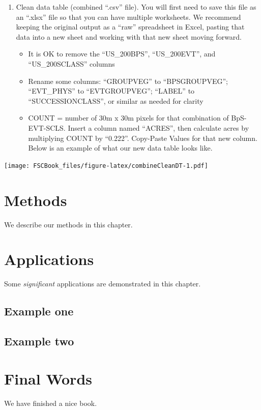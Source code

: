 \documentclass[
]{book}
\providecommand{\tightlist}{%
  \setlength{\itemsep}{0pt}\setlength{\parskip}{0pt}}
\begin{document}
\begin{enumerate}
\def\labelenumi{\arabic{enumi}.}
\setcounter{enumi}{2}
\tightlist
\item
  Clean data table (combined ``.csv'' file). You will first need to save this file as an ``.xlsx'' file so that you can have multiple worksheets. We recommend keeping the original output as a ``raw'' spreadsheet in Excel, pasting that data into a new sheet and working with that new sheet moving forward.

  \begin{itemize}
  \tightlist
  \item
    It is OK to remove the ``US\_200BPS'', ``US\_200EVT'', and ``US\_200SCLASS'' columns
  \item
    Rename some columns: ``GROUPVEG'' to ``BPSGROUPVEG''; ``EVT\_PHYS'' to ``EVTGROUPVEG''; ``LABEL'' to ``SUCCESSIONCLASS'', or similar as needed for clarity
  \item
    COUNT = number of 30m x 30m pixels for that combination of BpS-EVT-SCLS. Insert a column named ``ACRES'', then calculate acres by multiplying COUNT by ``0.222''. Copy-Paste Values for that new column. Below is an example of what our new data table looks like.
  \end{itemize}
\end{enumerate}

\texttt{[image: FSCBook\_files/figure-latex/combineCleanDT-1.pdf]}

\hypertarget{methods}{%
\chapter{Methods}\label{methods}}

We describe our methods in this chapter.

\hypertarget{applications}{%
\chapter{Applications}\label{applications}}

Some \emph{significant} applications are demonstrated in this chapter.

\hypertarget{example-one}{%
\section{Example one}\label{example-one}}

\hypertarget{example-two}{%
\section{Example two}\label{example-two}}

\hypertarget{final-words}{%
\chapter{Final Words}\label{final-words}}

We have finished a nice book.
\end{document}
